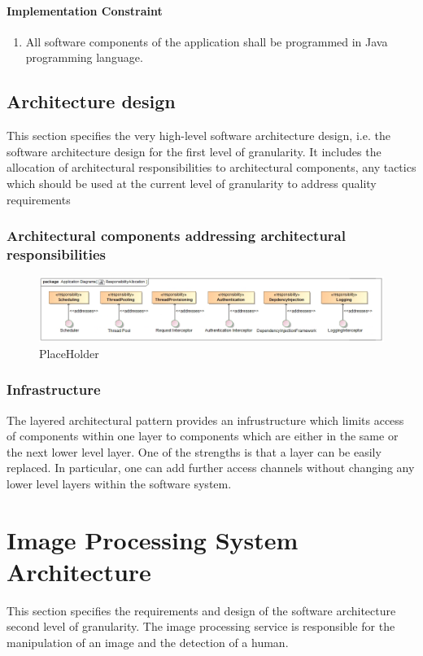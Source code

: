 \documentclass[a4paper,12pt]{report}
\begin{document}
\paragraph{Implementation Constraint}
\begin{enumerate}
	\item All software components of the application shall be programmed in Java programming language.
\end{enumerate}

\newpage

\subsection {Architecture design}
This section specifies the very high-level software architecture design, i.e. the software architecture
design for the first level of granularity. It includes the allocation of architectural responsibilities to
architectural components, any tactics which should be used at the current level of granularity to
address quality requirements

\subsubsection {Architectural components addressing architectural responsibilities}
	\begin{figure}[htb]
		\centering
		\includegraphics [scale=0.5]{../Diagrams/applicationServerResponsibiltiesAllocationZ.png}
		\caption{PlaceHolder}
	\end{figure}

\subsubsection {Infrastructure}
The layered architectural pattern provides an infrustructure which limits access of components within one layer to components which are either in the same or the next lower level layer. One of the strengths is that a layer can be easily replaced. In particular, one can add further access channels without changing any lower level layers within the software system.


\section {Image Processing System Architecture}
This section specifies the requirements and design of the software architecture second level of granularity. The image processing service is responsible for the manipulation of an image and the detection of a human.
\end{document}
